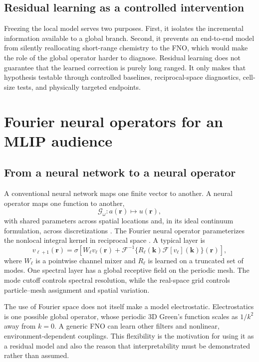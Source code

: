 \documentclass[11pt]{article}
\begin{document}
\subsection{Residual learning as a controlled intervention}

Freezing the local model serves two purposes. First, it isolates the
incremental information available to a global branch. Second, it prevents an
end-to-end model from silently reallocating short-range chemistry to the FNO,
which would make the role of the global operator harder to diagnose.
Residual learning does not guarantee that the learned correction is purely
long ranged. It only makes that hypothesis testable through controlled
baselines, reciprocal-space diagnostics, cell-size tests, and physically
targeted endpoints.

\section{Fourier neural operators for an MLIP audience}

\subsection{From a neural network to a neural operator}

A conventional neural network maps one finite vector to another. A neural
operator maps one function to another,
\[
 \mathcal G_\omega:a(\mathbf r)\longmapsto u(\mathbf r),
\]
with shared parameters across spatial locations and, in its ideal continuum
formulation, across discretizations \citep{kovachki2023neuraloperator}. The
Fourier neural operator parameterizes the nonlocal integral kernel in
reciprocal space \citep{li2021fno}. A typical layer is
\begin{equation}
 v_{\ell+1}(\mathbf r)=\sigma\!\left[
 W_\ell v_\ell(\mathbf r)+
 \mathcal F^{-1}\{R_\ell(\mathbf k)\mathcal F[v_\ell](\mathbf k)\}(\mathbf r)
 \right],
 \label{eq:fno-layer}
\end{equation}
where \(W_\ell\) is a pointwise channel mixer and \(R_\ell\) is learned on a
truncated set of modes. One spectral layer has a global receptive field on
the periodic mesh. The mode cutoff controls spectral resolution, while the
real-space grid controls particle--mesh assignment and spatial variation.

The use of Fourier space does not itself make a model electrostatic.
Electrostatics is one possible global operator, whose periodic 3D Green's
function scales as \(1/k^2\) away from \(k=0\). A generic FNO can learn other
filters and nonlinear, environment-dependent couplings. This flexibility is
the motivation for using it as a residual model and also the reason that
interpretability must be demonstrated rather than assumed.
\end{document}
